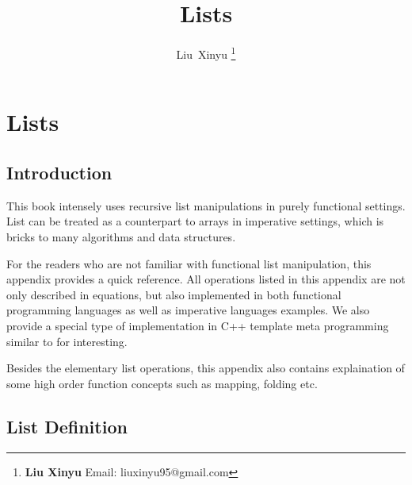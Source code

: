 \documentclass{article}
\begin{document}
\fi


\title{Lists}

\author{Liu~Xinyu
\thanks{{\bfseries Liu Xinyu } \newline
  Email: liuxinyu95@gmail.com \newline}
  }


\maketitle

\ifx\wholebook\relax
\chapter{Lists}
\fi

\section{Introduction}
\label{introduction}
This book intensely uses recursive list manipulations in purely functional settings.
List can be treated as a counterpart to arrays in imperative settings, which is
bricks to many algorithms and data structures.

For the readers who are not familiar with functional list manipulation, this appendix
provides a quick reference. All operations listed in this appendix are not only
described in equations, but also implemented in both functional programming languages
as well as imperative languages examples. We also provide a special type of
implementation in C++ template meta programming similar to \cite{moderncxx}
for interesting.

Besides the elementary list operations, this appendix also contains explaination of 
some high order function concepts such as mapping, folding etc.


\section{List Definition}
\end{document}
